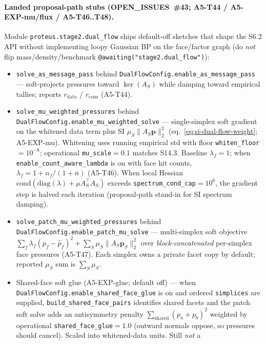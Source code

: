 \documentclass[11pt]{article}
\begin{document}
\paragraph{Landed proposal-path stubs (OPEN\_ISSUES~\#43; A5-T44 / A5-EXP-mu/flux /
A5-T46..T48).}
Module \texttt{proteus.stage2.dual\_flow} ships default-off sketches that
shape the S6.2 API without implementing loopy Gaussian BP on the face/factor
graph (do \emph{not} flip mass/density/benchmark
\texttt{@awaiting("stage2.dual\_flow")}):
\begin{itemize}[leftmargin=1.5em]
  \item \texttt{solve\_as\_message\_pass} behind
  \texttt{DualFlowConfig.enable\_as\_message\_pass} --- soft-projects pressures
  toward $\ker(A_S)$ while damping toward empirical tallies; reports
  $r_{\mathrm{data}}$ / $r_{\mathrm{cons}}$ (A5-T44).
  \item \texttt{solve\_mu\_weighted\_pressures} behind
  \texttt{DualFlowConfig.enable\_mu\_weighted\_solve} --- single-simplex soft
  gradient on the whitened data term plus SI $\mu_S\|A_S\mathbf p\|_2^2$
  (eq.~\ref{eq:si-dual-flow-weight}; A5-EXP-mu). Whitening uses running empirical
  std with floor \texttt{whiten\_floor}${=}10^{-8}$; operational
  \texttt{mu\_scale}${=}0.1$ matches S14.3. Baseline $\lambda_f{=}1$; when
  \texttt{enable\_count\_aware\_lambda} is on with face hit counts,
  $\lambda_f{=}1+n_f/(1+\bar n)$ (A5-T46). When local Hessian
  $\mathrm{cond}(\mathrm{diag}(\lambda)+\mu A_S^\top A_S)$ exceeds
  \texttt{spectrum\_cond\_cap}${=}10^{6}$, the gradient step is halved each
  iteration (proposal-path stand-in for SI spectrum damping).
  \item \texttt{solve\_patch\_mu\_weighted\_pressures} behind
  \texttt{DualFlowConfig.enable\_patch\_mu\_solve} --- multi-simplex soft
  objective $\sum_f\lambda_f(p_f-\hat p_f)^2+\sum_S\mu_S\|A_S\mathbf p_S\|_2^2$
  over \emph{block-concatenated} per-simplex face pressures (A5-T47). Each
  simplex owns a private facet copy by default; reported $\mu_S$ sum is
  $\sum_S\mu_S$.
  \item Shared-face soft glue (A5-EXP-glue; default off) --- when
  \texttt{DualFlowConfig.enable\_shared\_face\_glue} is on and ordered
  \texttt{simplices} are supplied, \texttt{build\_shared\_face\_pairs}
  identifies shared facets and the patch soft solve adds an antisymmetry
  penalty $\sum_{\mathrm{shared}}(p_a+p_b)^2$ weighted by operational
  \texttt{shared\_face\_glue}${=}1.0$ (outward normals oppose, so pressures
  should cancel). Scaled into whitened-data units. Still \emph{not} a

\end{itemize}
\end{document}
